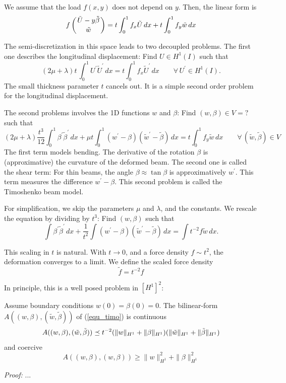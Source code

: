 \bigskip

We assume that the load $f(x,y)$ does not depend on $y$. Then, the linear form is
$$
f \left( \tilde U-y \tilde  \beta \atop \tilde w \right) = 
t \int_0^1 f_x \tilde U \, dx + t \int_0^1 f_y \tilde w \, dx
$$

The semi-discretization in this space leads to two decoupled problems. The first one
describes the longitudinal displacement: Find $U \in H^1(I)$ such that
$$
(2 \mu + \lambda) t \, \int_0^1 U^\prime \tilde U^\prime \, dx = 
t \int_0^1 f_x \tilde U^\prime \, dx \qquad \forall \, U^\prime \in H^1(I).
$$
The small thickness parameter $t$ cancels out. It is a simple second order problem
for the longitudinal displacement.

\medskip

The second problems involves the 1D functions $w$ and $\beta$: Find $(w,\beta) \in V = ?$
such that
$$
(2\mu+\lambda) \frac{t^3}{12} \int_0^1 \beta^\prime \tilde \beta^\prime \, dx + \mu t \int_0^1 (w^\prime - \beta) (\tilde w^\prime - \tilde \beta) \, dx = t \int_0^1 f_y \tilde w \, dx
\qquad \forall \, (\tilde w, \tilde \beta) \in V
$$
The first term models bending. The derivative of the rotation $\beta$ is (approximative)
the curvature of the deformed beam. The second one is called the shear term: For thin
beams, the angle $\beta \approx \tan \beta$ is approximatively $w^\prime$. This term
measures the difference $w^\prime - \beta$. 
This second problem is called the Timoshenko beam model. 


\bigskip

For simplification, we skip the parameters $\mu$ and $\lambda$, and the constants. 
We rescale the equation by dividing by $t^3$: Find $(w,\beta)$ such that
\begin{equation} \label{equ_timo}
\int \beta^\prime \tilde \beta^\prime \, dx + \frac{1}{t^2} \int (w^\prime - \beta) (\tilde w^\prime - \tilde \beta) \, dx = \int t^{-2} f \tilde w \, dx.
\end{equation}

This scaling in $t$ is natural. With $t \rightarrow 0$, and a force density $f \sim t^2$,
the deformation converges to a limit. We define the scaled force density
$$
\tilde f = t^{-2} f
$$

In principle, this is a well posed problem in $[H^1]^2$:

\begin{lemma} Assume boundary conditions $w(0) = \beta(0) = 0$. The 
bilinear-form $A((w,\beta), (\tilde w, \tilde \beta))$ of (\ref{equ_timo}) is 
continuous
$$
A( (w,\beta), (\tilde w, \tilde \beta)) \preceq t^{-2} 
( \| w \|_{H^1} + \| \beta \|_{H^1} ) ( \| \tilde w \|_{H^1} + \| \tilde \beta \|_{H^1} )
$$
and coercive
$$
A ( (w, \beta), (w, \beta) ) \geq \| w \|_{H^1}^2 + \| \beta \|_{H^1}^2
$$
\end{lemma}
{\em Proof: } ...

